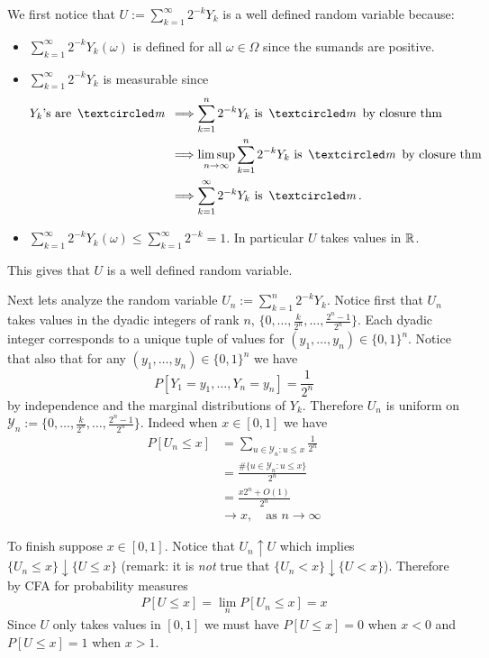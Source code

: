 \begin{exerciseproof}

We first notice that $U:= \sum_{k=1}^\infty 2^{-k} Y_k$  is a well defined random variable because:
\begin{itemize}
\item $\sum_{k=1}^\infty 2^{-k} Y_k(\omega)$ is defined for all $\omega\in\Omega$ since the sumands are positive.
\item  $\sum_{k=1}^\infty 2^{-k} Y_k$  is measurable since
\begin{align*}
\text{$Y_k$'s are  $\mcirc$ }
&\Longrightarrow \text{$\sum_{k=1}^n 2^{-k} Y_k$ is $\mcirc$ by closure thm}\\
&\Longrightarrow \text{$\limsup_{n\rightarrow \infty}\sum_{k=1}^n 2^{-k} Y_k$ is  $\mcirc$ by closure thm} \\
&\Longrightarrow \text{$\sum_{k=1}^\infty 2^{-k} Y_k$ is  $\mcirc$.}
\end{align*}
\item $\sum_{k=1}^\infty 2^{-k} Y_k(\omega)\leq \sum_{k=1}^\infty 2^{-k} = 1$. In particular $U$ takes values in $\Bbb R$.
\end{itemize}
This gives that $U$ is a well defined random variable.

Next lets analyze the random variable $U_n:=\sum_{k=1}^n 2^{-k} Y_k$. Notice first that $U_n$ takes values in the dyadic integers of rank $n$, $\{0,\ldots, \frac{k}{2^n},\ldots, \frac{2^n-1}{2^n}\}$. Each dyadic integer corresponds to a unique tuple of values for $(y_1,\ldots, y_n)\in \{0,1\}^n$. Notice that also that for any $(y_1,\ldots, y_n)\in \{0,1\}^n$ we have
\[P[Y_1 = y_1, \ldots, Y_n=y_n] = \frac{1}{2^n}  \]
by independence and the marginal distributions of $Y_k$. Therefore $U_n$ is uniform on $\mathcal Y_n:= \{0,\ldots, \frac{k}{2^n},\ldots, \frac{2^n-1}{2^n}\}$. Indeed when $x\in [0,1]$ we have
\begin{align*}
P[U_n \leq x ]
&= \sum_{u\in \mathcal Y_n: u\leq x}  \frac{1}{2^n} \\
&= \frac{\# \{u\in \mathcal Y_n: u\leq x\}}{2^n} \\
&= \frac{x2^n +O(1)}{2^n} \\
&\rightarrow x,\quad\text{as $n\rightarrow \infty$}
\end{align*}

To finish  suppose $x\in [0,1]$. Notice that $U_n\uparrow U$ which implies $\{U_n\leq x\}\downarrow \{U\leq x \}$ (remark: it is {\em not} true that $\{U_n< x\}\downarrow \{U< x \}$). Therefore by CFA for probability measures
\begin{align*}
P[U\leq x] =  \lim_n P[U_n\leq x] = x
\end{align*}
Since $U$ only takes values in $[0,1]$ we must have $P[U\leq x] = 0$ when $x<0$ and $P[U\leq x] = 1$ when $x>1$.

\end{exerciseproof}


